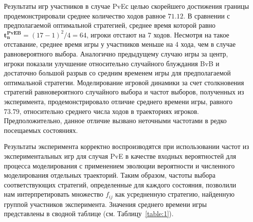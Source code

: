 Результаты игр участников в случае PvEс целью скорейшего достижения границы продемонстрировали среднее количество ходов равное $71.12$.
В сравнении с предполагаемой оптимальной стратегией, среднее время которой равно $\boldsymbol{t_n^{PvE B}} = (17-1)^2/4 = 64$, игроки 
отстают на 7 ходов. Несмотря на такое отставание, среднее время игры у участников меньше на 4 хода, чем в случае равновероятного выбора. 
Аналогично предыдущему случаю игры за центр, игроки показали улучшение относительно случайного блуждания BvB и достаточно большой разрыв со средним временем игры
для предполагаемой оптимальной стратегии. Моделирование игровой динамики за счет столкновения стратегий равновероятного случайного выбора и 
частот выборов, полученных из эксперимента, продемонстрировало отличие среднего времени игры, равного $73.79$, относительно среднего числа ходов в траекториях игроков.
Предположительно, данное отличие вызвано неточными частотами в редко посещаемых состояниях. 

Результаты эксперимента корректно воспроизводятся при использовании частот из экспериментальных игр для случая PvE в
качестве входных вероятностей для процесса моделирования с применением эволюции вероятности и численного моделирования отдельных траекторий. 
Таким образом, частоты выбора соответствующих стратегий, определенные для каждого состояния, позволили нам интерпретировать множество $f_{ij}$ как усредненную стратегию, 
найденную группой участников эксперимента. Значения среднего времени игры представлены в сводной таблице (см. Таблицу~\ref{table:1}).

